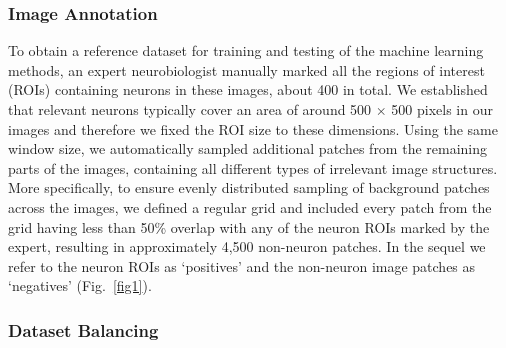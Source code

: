 \subsubsection{Image Annotation}
\label{sec:annotation}

To obtain a reference dataset for training and testing of the machine learning methods, an expert neurobiologist manually marked all the regions of interest (ROIs) containing neurons in these images, about 400 in total. We established that relevant neurons typically cover an area of around 500 $\times$ 500 pixels in our images and therefore we fixed the ROI size to these dimensions. Using the same window size, we automatically sampled additional patches from the remaining parts of the images, containing all different types of irrelevant image structures. More specifically, to ensure evenly distributed sampling of background patches across the images, we defined a regular grid and included every patch from the grid having less than 50\% overlap with any of the neuron ROIs marked by the expert, resulting in approximately 4,500 non-neuron patches. In the sequel we refer to the neuron ROIs as `positives' and the non-neuron image patches as `negatives' (Fig.~\ref{fig1}).

\subsubsection{Dataset Balancing}
\label{sec:balanced}

